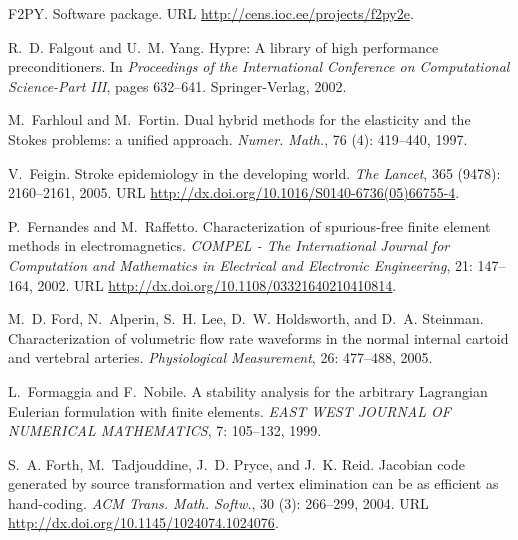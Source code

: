 \begin{thebibliography}{467}
{F2PY}.
\newblock Software package.
\newblock URL \url{http://cens.ioc.ee/projects/f2py2e}.

R.~D. Falgout and U.~M. Yang.
\newblock Hypre: {A} library of high performance preconditioners.
\newblock In \emph{Proceedings of the International Conference on Computational
  Science-Part III}, pages 632--641. Springer-Verlag, 2002.

M.~Farhloul and M.~Fortin.
\newblock Dual hybrid methods for the elasticity and the {S}tokes problems: a
  unified approach.
\newblock \emph{Numer. Math.}, 76 (4): 419--440, 1997.

V.~Feigin.
\newblock Stroke epidemiology in the developing world.
\newblock \emph{The Lancet}, 365 (9478): 2160--2161, 2005.
\newblock URL \url{http://dx.doi.org/10.1016/S0140-6736(05)66755-4}.

P.~Fernandes and M.~Raffetto.
\newblock Characterization of spurious-free finite element methods in
  electromagnetics.
\newblock \emph{COMPEL - The International Journal for Computation and
  Mathematics in Electrical and Electronic Engineering}, 21: 147--164,
  2002.
\newblock URL \url{http://dx.doi.org/10.1108/03321640210410814}.

M.~D. Ford, N.~Alperin, S.~H. Lee, D.~W. Holdsworth, and D.~A. Steinman.
\newblock Characterization of volumetric flow rate waveforms in the normal
  internal cartoid and vertebral arteries.
\newblock \emph{Physiological Measurement}, 26: 477--488, 2005.

L.~Formaggia and F.~Nobile.
\newblock A stability analysis for the arbitrary {L}agrangian {E}ulerian
  formulation with finite elements.
\newblock \emph{EAST WEST JOURNAL OF NUMERICAL MATHEMATICS}, 7:
  105--132, 1999.

S.~A. Forth, M.~Tadjouddine, J.~D. Pryce, and J.~K. Reid.
\newblock Jacobian code generated by source transformation and vertex
  elimination can be as efficient as hand-coding.
\newblock \emph{ACM Trans. Math. Softw.}, 30 (3): 266--299,
  2004.
\newblock URL \url{http://dx.doi.org/10.1145/1024074.1024076}.


\end{thebibliography}
